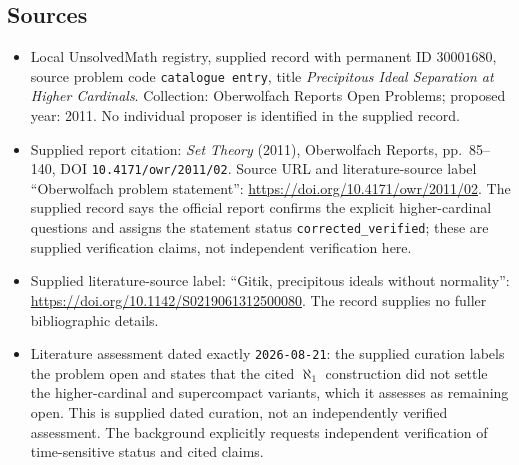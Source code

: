 \documentclass[11pt]{article}
\begin{document}
\subsection{Sources}
\begin{itemize}
\item Local UnsolvedMath registry, supplied record with permanent ID \(30001680\), source problem code \texttt{catalogue entry}, title \emph{Precipitous Ideal Separation at Higher Cardinals}. Collection: Oberwolfach Reports Open Problems; proposed year: 2011. No individual proposer is identified in the supplied record.
\item Supplied report citation: \emph{Set Theory} (2011), Oberwolfach Reports, pp.~85--140, DOI \texttt{10.4171/owr/2011/02}. Source URL and literature-source label ``Oberwolfach problem statement'': \url{https://doi.org/10.4171/owr/2011/02}. The supplied record says the official report confirms the explicit higher-cardinal questions and assigns the statement status \texttt{corrected\_verified}; these are supplied verification claims, not independent verification here.
\item Supplied literature-source label: ``Gitik, precipitous ideals without normality'': \url{https://doi.org/10.1142/S0219061312500080}. The record supplies no fuller bibliographic details.
\item Literature assessment dated exactly \texttt{2026-08-21}: the supplied curation labels the problem open and states that the cited \(\aleph_1\) construction did not settle the higher-cardinal and supercompact variants, which it assesses as remaining open. This is supplied dated curation, not an independently verified assessment. The background explicitly requests independent verification of time-sensitive status and cited claims.
\end{itemize}
\end{document}

